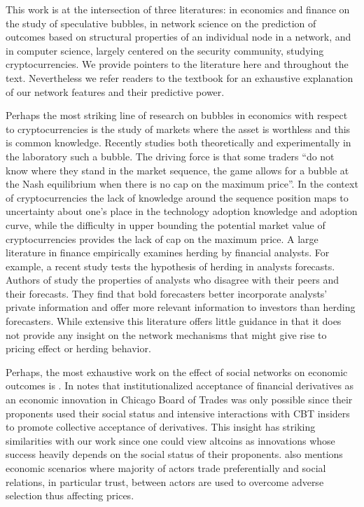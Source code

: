 This work is at the intersection of three literatures: in economics and finance on the study of speculative bubbles, in network science on the prediction of outcomes based on structural properties of an individual node in a network, and in computer science, largely centered on the security community, studying cryptocurrencies.
We provide pointers to the literature here and throughout the text. Nevertheless we refer readers to the textbook \cite{KleinbergNetworks} for an exhaustive explanation of our network features and their predictive power.

Perhaps the most striking line of research on bubbles in economics with respect to cryptocurrencies is the study of markets where the asset is worthless and this is common knowledge. 
Recently \cite{moinas2013bubble} studies both theoretically and experimentally in the laboratory such a bubble. 
The driving force is that some traders ``do not know where they stand in the market sequence, the game allows for
a bubble at the Nash equilibrium when there is no cap on the maximum price''.
In the context of cryptocurrencies the lack of knowledge around the sequence position maps to uncertainty about one's place in the technology adoption knowledge and adoption curve, while the difficulty in upper bounding the potential market value of cryptocurrencies provides the lack of cap on the maximum price. 
A large literature in finance empirically examines herding by financial analysts. For example, a recent study \cite{jegadeesh2009analysts} tests the hypothesis of herding in analysts forecasts. 
Authors of \cite{clement2005financial} study the properties of analysts who disagree with their peers and their forecasts. They find that bold forecasters better incorporate analysts' private information and offer more relevant information to investors than herding forecasters.
While extensive this literature offers little guidance in that it does not provide any insight on the network mechanisms that might give rise to pricing effect or herding behavior.

Perhaps, the most exhaustive work on the effect of social networks on economic outcomes is \cite{Granovetter-outcomes}. In \cite{Granovetter-outcomes} notes that institutionalized acceptance of financial derivatives as an economic innovation in Chicago Board of Trades was only possible since their proponents used their social status and intensive interactions with CBT insiders to promote collective acceptance of derivatives. This insight has striking similarities with our work since one could view altcoins as innovations whose success heavily depends on the social status of their proponents. \cite{Granovetter-outcomes} also mentions economic scenarios where majority of actors trade preferentially and social relations, in particular trust, between actors are used to overcome adverse selection thus affecting prices.


